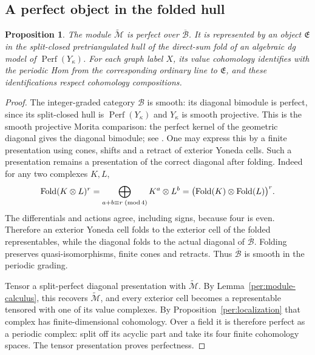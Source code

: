 \documentclass[11pt]{article}
\newtheorem{proposition}[theorem]{Proposition}
\theoremstyle{definition}
\theoremstyle{remark}
\DeclareMathOperator{\Perf}{Perf}
\numberwithin{equation}{section}
\begin{document}
\subsection{A perfect object in the folded hull}

\begin{proposition}
\label{per:perfect}
The module $\widetilde{\mathcal M}$ is perfect over
$\overline{\mathcal B}$.  It is represented by an object
$\mathfrak E$ in the split-closed pretriangulated hull of the
direct-sum fold of an algebraic dg model of $\Perf(Y_\kappa)$.  For
each graph label $X$, its value cohomology identifies with the
periodic Hom from the corresponding ordinary line to $\mathfrak E$,
and these identifications respect cohomology compositions.
\end{proposition}

\begin{proof}
The integer-graded category $\mathcal B$ is smooth: its diagonal
bimodule is perfect, since its split-closed hull is
$\Perf(Y_\kappa)$ and $Y_\kappa$ is smooth projective.  This is the
smooth projective Morita comparison: the perfect kernel of the
geometric diagonal gives the diagonal bimodule; see
\cite{toen-vaquie}.  One may express
this by a finite presentation using cones, shifts and a retract of
exterior Yoneda cells.  Such a presentation remains a presentation of
the correct diagonal after folding.  Indeed for any two complexes
$K,L$,
\[
 \operatorname{Fold}(K\otimes L)^r
   =\bigoplus_{a+b\equiv r\;({\rm mod}\,4)}K^a\otimes L^b
   =\bigl(\operatorname{Fold}(K)\otimes
                      \operatorname{Fold}(L)\bigr)^r.
\]
The differentials and actions agree, including signs, because four
is even.  Therefore an exterior Yoneda cell folds to the exterior
cell of the folded representables, while the diagonal folds to the
actual diagonal of $\overline{\mathcal B}$.  Folding preserves
quasi-isomorphisms, finite cones and retracts.  Thus
$\overline{\mathcal B}$ is smooth in the periodic grading.

Tensor a split-perfect diagonal presentation with
$\widetilde{\mathcal M}$.  By Lemma~\ref{per:module-calculus}, this
recovers $\widetilde{\mathcal M}$, and every exterior cell becomes a
representable tensored with one of its value complexes.  By
Proposition~\ref{per:localization} that complex has finite-dimensional
cohomology.  Over a field it is therefore perfect as a periodic
complex: split off its acyclic part and take its four finite
cohomology spaces.  The tensor presentation proves perfectness.


\end{proof}
\end{document}
